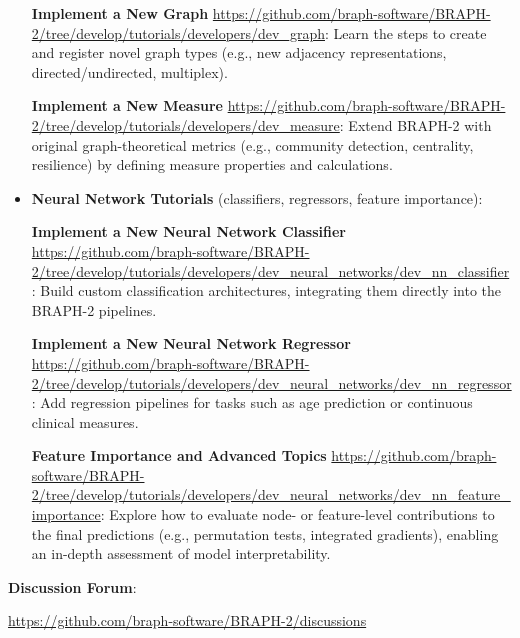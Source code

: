 \documentclass[justified]{tufte-handout}
\begin{document}
\begin{itemize}
\textbf{Implement a New Graph} \url{https://github.com/braph-software/BRAPH-2/tree/develop/tutorials/developers/dev_graph}:  
Learn the steps to create and register novel graph types (e.g., new adjacency representations, directed/undirected, multiplex).

\textbf{Implement a New Measure} \url{https://github.com/braph-software/BRAPH-2/tree/develop/tutorials/developers/dev_measure}:
Extend BRAPH-2 with original graph-theoretical metrics (e.g., community detection, centrality, resilience) by defining measure properties and calculations.

\item \textbf{Neural Network Tutorials} (classifiers, regressors, feature importance):

\textbf{Implement a New Neural Network Classifier} \url{https://github.com/braph-software/BRAPH-2/tree/develop/tutorials/developers/dev_neural_networks/dev_nn_classifier}:
Build custom classification architectures, integrating them directly into the BRAPH-2 pipelines.

\textbf{Implement a New Neural Network Regressor} \url{https://github.com/braph-software/BRAPH-2/tree/develop/tutorials/developers/dev_neural_networks/dev_nn_regressor}:  
Add regression pipelines for tasks such as age prediction or continuous clinical measures.

\textbf{Feature Importance and Advanced Topics} \url{https://github.com/braph-software/BRAPH-2/tree/develop/tutorials/developers/dev_neural_networks/dev_nn_feature_importance}:  
Explore how to evaluate node- or feature-level contributions to the final predictions (e.g., permutation tests, integrated gradients), enabling an in-depth assessment of model interpretability.

\end{itemize}

\textbf{Discussion Forum}: 

\url{https://github.com/braph-software/BRAPH-2/discussions}
\end{document}
